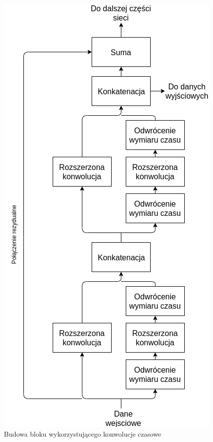 \documentclass[a4paper,11pt,twoside]{report}
\theoremstyle{definition}
\begin{document}
\begin{figure}[h!]
	\centering
	\includegraphics[scale=0.7]{tcn_block}
	\caption{Budowa bloku wykorzystującego konwolucje czasowe}
\end{figure}
\end{document}
